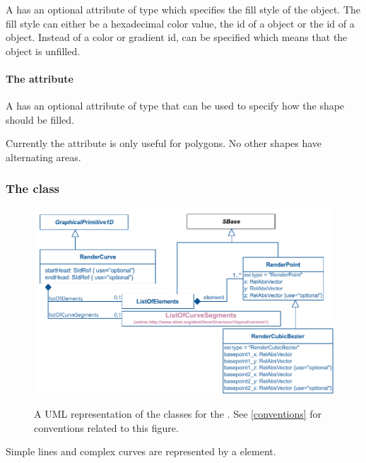 A \GraphicalPrimitiveTwoD has an optional attribute  of type
 which specifies 
the fill style of the object. The fill style can either be a hexadecimal
color value, the id of a \ColorDefinition object or the id of a \GradientBase
object. 
Instead of a color or gradient id,  can be specified
 which means that the object is unfilled.


\paragraph{The \fixttspace{} attribute}

A \GraphicalPrimitiveTwoD has an optional attribute  of
type \FillRule that can be used to specify how the shape should be filled. 

Currently the  attribute is only useful for polygons. No other shapes have alternating areas.

\subsubsection{The  class}
\label{rendercurve-class}
\begin{figure}[!ht]
  \centering
  \includegraphics{images/render-curve-uml}\\
  \caption{A UML representation of the \RenderCurve classes for the \RenderPackage.  See \ref{conventions} for conventions related to this figure. }
  \label{fig:curve_render_uml}
\end{figure}

Simple lines and complex curves are represented by a \RenderCurve element. 

